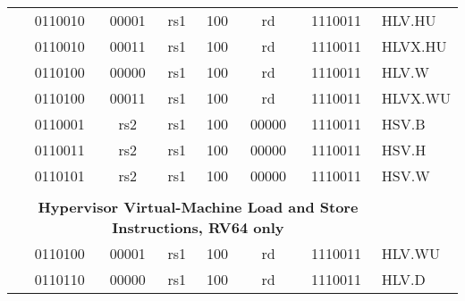 \begin{table}[p]
\begin{small}
\begin{center}
\begin{tabular}{p{0in}p{0.4in}p{0.05in}p{0.05in}p{0.05in}p{0.05in}p{0.4in}p{0.6in}p{0.4in}p{0.6in}p{0.7in}l}
&
\multicolumn{4}{|c|}{0110010} &
\multicolumn{2}{c|}{00001} &
\multicolumn{1}{c|}{rs1} &
\multicolumn{1}{c|}{100} &
\multicolumn{1}{c|}{rd} &
\multicolumn{1}{c|}{1110011} & HLV.HU \\
\cline{2-11}


&
\multicolumn{4}{|c|}{0110010} &
\multicolumn{2}{c|}{00011} &
\multicolumn{1}{c|}{rs1} &
\multicolumn{1}{c|}{100} &
\multicolumn{1}{c|}{rd} &
\multicolumn{1}{c|}{1110011} & HLVX.HU \\
\cline{2-11}


&
\multicolumn{4}{|c|}{0110100} &
\multicolumn{2}{c|}{00000} &
\multicolumn{1}{c|}{rs1} &
\multicolumn{1}{c|}{100} &
\multicolumn{1}{c|}{rd} &
\multicolumn{1}{c|}{1110011} & HLV.W \\
\cline{2-11}


&
\multicolumn{4}{|c|}{0110100} &
\multicolumn{2}{c|}{00011} &
\multicolumn{1}{c|}{rs1} &
\multicolumn{1}{c|}{100} &
\multicolumn{1}{c|}{rd} &
\multicolumn{1}{c|}{1110011} & HLVX.WU \\
\cline{2-11}


&
\multicolumn{4}{|c|}{0110001} &
\multicolumn{2}{c|}{rs2} &
\multicolumn{1}{c|}{rs1} &
\multicolumn{1}{c|}{100} &
\multicolumn{1}{c|}{00000} &
\multicolumn{1}{c|}{1110011} & HSV.B \\
\cline{2-11}


&
\multicolumn{4}{|c|}{0110011} &
\multicolumn{2}{c|}{rs2} &
\multicolumn{1}{c|}{rs1} &
\multicolumn{1}{c|}{100} &
\multicolumn{1}{c|}{00000} &
\multicolumn{1}{c|}{1110011} & HSV.H \\
\cline{2-11}


&
\multicolumn{4}{|c|}{0110101} &
\multicolumn{2}{c|}{rs2} &
\multicolumn{1}{c|}{rs1} &
\multicolumn{1}{c|}{100} &
\multicolumn{1}{c|}{00000} &
\multicolumn{1}{c|}{1110011} & HSV.W \\
\cline{2-11}


&
\multicolumn{10}{c}{} & \\
&
\multicolumn{10}{c}{\bf Hypervisor Virtual-Machine Load and Store Instructions, RV64 only} & \\
\cline{2-11}


&
\multicolumn{4}{|c|}{0110100} &
\multicolumn{2}{c|}{00001} &
\multicolumn{1}{c|}{rs1} &
\multicolumn{1}{c|}{100} &
\multicolumn{1}{c|}{rd} &
\multicolumn{1}{c|}{1110011} & HLV.WU \\
\cline{2-11}


&
\multicolumn{4}{|c|}{0110110} &
\multicolumn{2}{c|}{00000} &
\multicolumn{1}{c|}{rs1} &
\multicolumn{1}{c|}{100} &
\multicolumn{1}{c|}{rd} &
\multicolumn{1}{c|}{1110011} & HLV.D \\
\cline{2-11}



\end{tabular}
\end{center}
\end{small}
\end{table}
